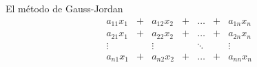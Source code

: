 
El método de Gauss-Jordan 
\[
\begin{array}{ccccccc}
	a_{11}x_1 & + & a_{12}x_2 & + & \dots & + & a_{1n}x_n \\
	a_{21}x_1 & + & a_{22}x_2 & + & \dots & + & a_{2n}x_n \\
	\vdots &  & \vdots &  & \ddots &  & \vdots \\
	a_{n1}x_1 & + & a_{n2}x_2 & + & \dots & + & a_{nn}x_n
\end{array}
\]